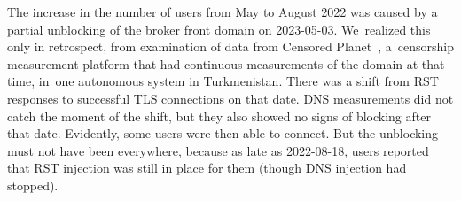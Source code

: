 \documentclass[letterpaper,twocolumn]{article}
\begin{document}
The increase in the number of users from May to August 2022
was caused by
a partial unblocking of the broker front domain on \mbox{2023-05-03}.
We~realized this only in retrospect,
from examination of data from Censored Planet~\cite{Raman2020c},
a~censorship measurement platform that had continuous measurements
of the domain at that time, in~one autonomous system in Turkmenistan.
There was a shift from RST responses to successful TLS connections on that date.
DNS measurements did not catch the moment of the shift,
but they also showed no signs of blocking after that date.
Evidently, some users were then able to connect.
But the unblocking must not have been everywhere, because as late as \mbox{2022-08-18},
users reported that RST injection was still in place for them
(though DNS injection had stopped).

\end{document}
